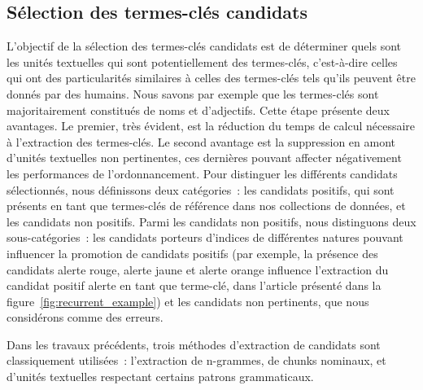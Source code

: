   \subsection{Sélection des termes-clés candidats}
  \label{subsec:extraction_de_termes_cles_candidats}
    L'objectif de la sélection des termes-clés candidats est de déterminer quels
    sont les unités textuelles qui sont potentiellement des termes-clés,
    c'est-à-dire celles qui ont des particularités similaires à celles des
    termes-clés tels qu'ils peuvent être donnés par des humains. Nous savons par
    exemple que les termes-clés sont majoritairement constitués de noms et
    d'adjectifs. Cette étape présente deux avantages. Le premier, très évident,
    est la réduction du temps de calcul nécessaire à l'extraction des
    termes-clés. Le second avantage est la suppression en amont d'unités
    textuelles non pertinentes, ces dernières pouvant affecter négativement les
    performances de l'ordonnancement. Pour distinguer les différents candidats
    sélectionnés, nous définissons deux catégories~: les candidats positifs, qui
    sont présents en tant que termes-clés de référence dans nos collections de
    données, et les candidats non positifs. Parmi les candidats non positifs,
    nous distinguons deux sous-catégories~: les candidats porteurs d'indices de
    différentes natures pouvant influencer la promotion de candidats positifs
    (par exemple, la présence des candidats \og{}alerte rouge\fg{}, \og{}alerte
    jaune\fg{} et \og{}alerte orange\fg{} influence l'extraction du candidat
    positif \og{}alerte\fg{} en tant que terme-clé, dans l'article présenté dans
    la figure~\ref{fig:recurrent_example}) et les candidats non pertinents, que
    nous considérons comme des erreurs.

    Dans les travaux précédents, trois méthodes d'extraction de candidats sont
    classiquement utilisées~: l'extraction de n-grammes, de chunks nominaux, et
    d'unités textuelles respectant certains patrons grammaticaux. 

